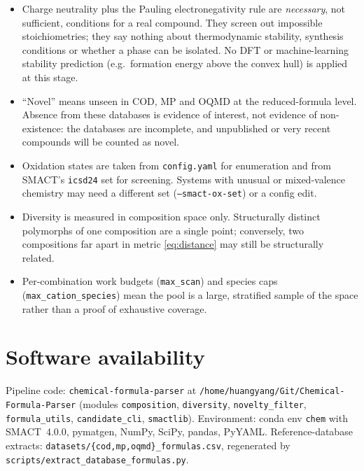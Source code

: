 \documentclass[11pt,a4paper]{article}
\newcommand{\pkg}[1]{\texttt{#1}}
\newcommand{\code}[1]{\texttt{#1}}
\newcommand{\cmd}[1]{\texttt{\small #1}}
\begin{document}
\begin{itemize}
  \item Charge neutrality plus the Pauling electronegativity rule are \emph{necessary}, not
        sufficient, conditions for a real compound. They screen out impossible stoichiometries; they
        say nothing about thermodynamic stability, synthesis conditions or whether a phase can be
        isolated. No DFT or machine-learning stability prediction (e.g.\ formation energy above the
        convex hull) is applied at this stage.
  \item ``Novel'' means unseen in COD, MP and OQMD at the reduced-formula level. Absence from these
        databases is evidence of interest, not evidence of non-existence: the databases are
        incomplete, and unpublished or very recent compounds will be counted as novel.
  \item Oxidation states are taken from \code{config.yaml} for enumeration and from SMACT's
        \code{icsd24} set for screening. Systems with unusual or mixed-valence chemistry may need a
        different set (\cmd{--smact-ox-set}) or a config edit.
  \item Diversity is measured in composition space only. Structurally distinct polymorphs of one
        composition are a single point; conversely, two compositions far apart in metric
        \eqref{eq:distance} may still be structurally related.
  \item Per-combination work budgets (\code{max\_scan}) and species caps
        (\code{max\_cation\_species}) mean the pool is a large, stratified sample of the space
        rather than a proof of exhaustive coverage.
\end{itemize}

\section*{Software availability}

Pipeline code: \code{chemical-formula-parser} at
\code{/home/huangyang/Git/Chemical-Formula-Parser} (modules \pkg{composition}, \pkg{diversity},
\pkg{novelty\_filter}, \pkg{formula\_utils}, \pkg{candidate\_cli}, \pkg{smactlib}).
Environment: conda env \code{chem} with SMACT~4.0.0, pymatgen, NumPy, SciPy, pandas, PyYAML.
Reference-database extracts: \code{datasets/\{cod,mp,oqmd\}\_formulas.csv}, regenerated by
\cmd{scripts/extract\_database\_formulas.py}.
\end{document}
